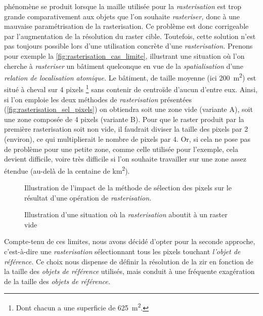 phénomène se produit lorsque la maille utilisée pour la
\emph{rasterisation} est trop grande comparativement aux objets que
l'on souhaite \emph{rasteriser,} donc à une mauvaise paramétrisation
de la rasterisation. Ce problème est donc corrigeable par
l'augmentation de la résolution du raster cible. Toutefois, cette
solution n'est pas toujours possible lors d'une utilisation concrète
d'une \emph{rasterisation.} Prenons pour exemple la
\autoref{fig:rasterisation_cas_limite}, illustrant une situation où
l'on cherche à \emph{rasteriser} un bâtiment quelconque en vue de la
\emph{spatialisation} d'une \emph{relation de localisation atomique.}
Le bâtiment, de taille moyenne (ici \SI{200}{\metre\squared}) est
situé à cheval sur 4 pixels \footnote{Dont chacun a une superficie de
  \SI{625}{\metre\squared}.} sans contenir de centroïde d'aucun
d'entre eux. Ainsi, si l'on emploie les deux méthodes de
\emph{rasterisation} présentées
(\autoref{fig:rasterisation_sel_pixels}) on obtiendra soit une zone
vide (variante \textcolor{RdBu-9-1}{\textsf{A}}), soit une zone
composée de 4 pixels (variante \textcolor{RdBu-9-9}{\textsf{B}}). Pour
que le raster produit par la première rasterisation soit non vide, il
faudrait diviser la taille des pixels par 2 (environ), ce qui
multiplierait le nombre de pixels par 4. Or, si cela ne pose pas de
problème pour une petite zone, comme celle utilisée pour l'exemple,
cela devient difficile, voire très difficile si l'on souhaite
travailler sur une zone assez étendue (au-delà de la centaine de
\si{\kilo\meter\squared}).

\begin{figure}
  \centering
  
  \caption{Illustration de l'impact de la méthode de sélection des
    pixels sur le résultat d'une opération de \emph{rasterisation.}}
  \label{fig:rasterisation_sel_pixels}
\end{figure}

\begin{figure}
  \centering
  
  \caption{Illustration d'une situation où la \emph{rasterisation}
    aboutit à un raster vide}
  \label{fig:rasterisation_cas_limite}
\end{figure}

Compte-tenu de ces limites, nous avons décidé d'opter pour la seconde
approche, c'est-à-dire une \emph{rasterisation} sélectionnant tous les
pixels touchant \emph{l'objet de référence.} Ce choix nous dispense de
définir la résolution de la \ac{zir} en fonction de la taille des
\emph{objets de référence} utilisés, mais conduit à une fréquente
exagération de la taille des \emph{objets de référence.}

